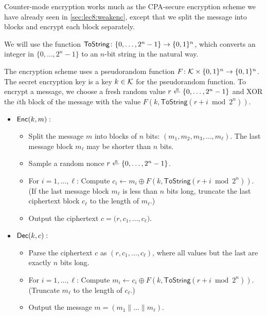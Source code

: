 Counter-mode encryption works much as the CPA-secure encryption
scheme we have already seen in \cref{sec:lec8:weakenc}, except 
that we split the message into blocks and encrypt each block separately.

\newcommand{\ToString}{\mathsf{ToString}}
We will use the function $\ToString \colon \{0, \dots, 2^n-1\} \to \zon$,
which converts an integer in $\{0, \dots, 2^n -1\}$ to an $n$-bit string in the natural way.

The encryption scheme uses a pseudorandom function $F \colon \mathcal{K} \times \{0,1\}^n \to \{0,1\}^n$.
The secret encryption key is a key $k \in \mathcal{K}$ for the pseudorandom function.
To encrypt a message, we choose a fresh random value $r \getsr \{0, \dots, 2^n-1\}$ and 
XOR the $i$th block of the message with the value $F(k, \ToString(r+i \bmod 2^n))$.

\begin{itemize}
  \item $\mathsf{Enc}(k, m):$
    \begin{itemize}
      \item Split the message $m$ into blocks of $n$ bits: $(m_1, m_2, m_3, \dots, m_\ell)$.
            The last message block $m_\ell$ may be shorter than $n$ bits.
      \item Sample a random nonce 
            $r \getsr \{0, \dots, 2^n-1\}$.
      \item For $i = 1, \dots, \ell$: Compute $c_i \gets m_i \oplus F(k, \mathsf{ToString}(r+i \bmod 2^n))$.\\
            (If the last message block $m_\ell$ is less than $n$ bits long, 
            truncate the last ciphertext block $c_\ell$ to the length of $m_\ell$.)
      \item Output the ciphertext $c = \big(r, c_1, \dots, c_\ell)$.
    \end{itemize}

  \item $\mathsf{Dec}(k, c):$
    \begin{itemize}
      \item Parse the ciphertext $c$ as $(r, c_1, \dots, c_\ell)$,
            where all values but the last are exactly $n$ bits long.
          \item For $i = 1, \dots, \ell$: Compute $m_i \gets c_i \oplus F(k, \ToString(r+i \bmod 2^n))$.
            (Truncate $m_\ell$ to the length of $c_\ell$.)
      \item Output the message $m = (m_1 \| \dots \| m_\ell)$.
    \end{itemize}

\end{itemize}

